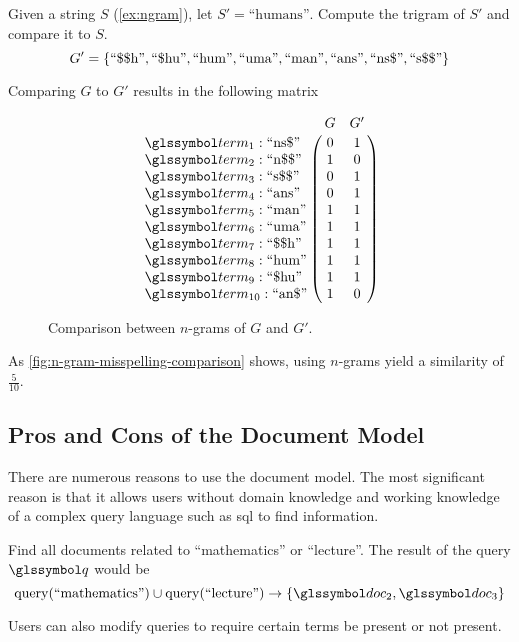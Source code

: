 		\begin{ex}
		\label{ex:n-gram-comparison}
			Given a string \(S\) (\vref{ex:ngram}), let \(S' = \text{``humans''}\).  Compute the trigram of \(S'\) and compare it to \(S\).
			\[
				G' = \{
					\text{``\char"24\char"24h''},
					\text{``\char"24hu''},
					\text{``hum''},
					\text{``uma''},
					\text{``man''},
					\text{``ans''},
					\text{``ns\char"24''},
					\text{``s\char"24\char"24''}
				\}
			\]
			
			Comparing \(G\) to \(G'\) results in the following matrix
			
			\begin{figure}
				\[
					\bordermatrix{
						~ & G & G' \cr
						\term_{1} : \text{``ns\char"24''} & 0 & 1 \cr
						\term_{2} : \text{``n\char"24\char"24''} & 1 & 0 \cr
						\term_{3} : \text{``s\char"24\char"24''} & 0 & 1 \cr
						\term_{4} : \text{``ans''} & 0 & 1 \cr
						\term_{5} : \text{``man''} & 1 & 1 \cr
						\term_{6} : \text{``uma''} & 1 & 1 \cr
						\term_{7} : \text{``\char"24\char"24h''} & 1 & 1 \cr
						\term_{8} : \text{``hum''} & 1 & 1 \cr
						\term_{9} : \text{``\char"24hu''} & 1 & 1 \cr
						\term_{10} : \text{``an\char"24''} & 1 & 0 \cr
					}
				\]
				
				\caption{Comparison between \(n\)-grams of \(G\) and \(G'\).}
				\label{fig:n-gram-misspelling-comparison}
			\end{figure}
			
			As \vref{fig:n-gram-misspelling-comparison} shows, using \(n\)-grams yield a similarity of \(\frac{5}{10}\).
		\end{ex}
			
	\subsection{Pros and Cons of the Document Model}
	\label{sec:pros-cons-document-model}
		There are numerous reasons to use the document model.  The most significant reason is that it allows users without domain knowledge and working knowledge of a complex query language such as \gls{sql} to find information.
		
		\begin{ex}
			Find all documents related to ``mathematics'' or ``lecture''.  The result of the query \(\q\) would be
			\[
				\query(\text{``mathematics''}) \cup \query(\text{``lecture''}) \rightarrow \{\doc_2, \doc_3\}
			\]
		\end{ex}
		
		Users can also modify queries to require certain terms be present or not present.
		
